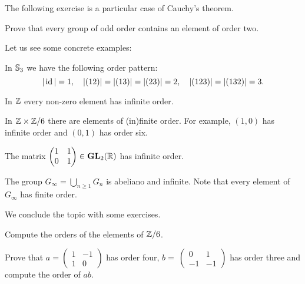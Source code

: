 The following exercise is a particular 
case of Cauchy's theorem. 
                
\begin{exercise}
        \label{xca:orden2}
        Prove that every group of odd order contains
        an element of order two. 
\end{exercise}
                
Let us see some concrete examples: 

\begin{example}
        In $\mathbb{S}_3$ we have the following order pattern:
                        \[
                        |\operatorname{id}|=1,\quad
                        |(12)|=|(13)|=|(23)|=2,\quad
                        |(123)|=|(132)|=3.
                        \]
\end{example}
                        
\begin{example}
        In $\mathbb{Z}$ every non-zero element has 
        infinite order. 
\end{example}
                        
 \begin{example}
        In $\mathbb{Z}\times\mathbb{Z}/6$ there are elements of 
        (in)finite order. For example, $(1,0)$ 
        has infinite order and 
        $(0,1)$ has order six. 
 \end{example}
                        
\begin{example}
        The matrix $\begin{pmatrix}1&1\\0&1\end{pmatrix}\in\mathbf{GL}_2(\mathbb{R})$ has infinite order.
\end{example}                     
                                
\begin{example}
        The group $G_\infty=\bigcup_{n\geq1}G_n$ is abeliano and infinite. Note that every element of 
        $G_\infty$ has finite order. 
\end{example}
          
We conclude the topic with some exercises. 

\begin{exercise}
        Compute the orders of the elements of $\mathbb{Z}/6$.
\end{exercise}       

\begin{exercise}
        Prove that $a=\begin{pmatrix}1&-1\\1&0\end{pmatrix}$ has order four, $b=\
        \begin{pmatrix}0&1\\-1&-1\end{pmatrix}$ has order three and 
        compute the order of $ab$.%
\end{exercise}
                                

